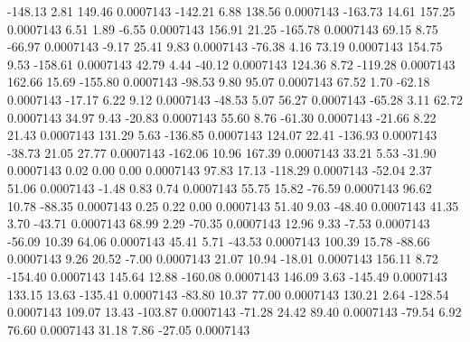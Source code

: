      -148.13        2.81      149.46     0.0007143
     -142.21        6.88      138.56     0.0007143
     -163.73       14.61      157.25     0.0007143
        6.51        1.89       -6.55     0.0007143
      156.91       21.25     -165.78     0.0007143
       69.15        8.75      -66.97     0.0007143
       -9.17       25.41        9.83     0.0007143
      -76.38        4.16       73.19     0.0007143
      154.75        9.53     -158.61     0.0007143
       42.79        4.44      -40.12     0.0007143
      124.36        8.72     -119.28     0.0007143
      162.66       15.69     -155.80     0.0007143
      -98.53        9.80       95.07     0.0007143
       67.52        1.70      -62.18     0.0007143
      -17.17        6.22        9.12     0.0007143
      -48.53        5.07       56.27     0.0007143
      -65.28        3.11       62.72     0.0007143
       34.97        9.43      -20.83     0.0007143
       55.60        8.76      -61.30     0.0007143
      -21.66        8.22       21.43     0.0007143
      131.29        5.63     -136.85     0.0007143
      124.07       22.41     -136.93     0.0007143
      -38.73       21.05       27.77     0.0007143
     -162.06       10.96      167.39     0.0007143
       33.21        5.53      -31.90     0.0007143
        0.02        0.00        0.00     0.0007143
       97.83       17.13     -118.29     0.0007143
      -52.04        2.37       51.06     0.0007143
       -1.48        0.83        0.74     0.0007143
       55.75       15.82      -76.59     0.0007143
       96.62       10.78      -88.35     0.0007143
        0.25        0.22        0.00     0.0007143
       51.40        9.03      -48.40     0.0007143
       41.35        3.70      -43.71     0.0007143
       68.99        2.29      -70.35     0.0007143
       12.96        9.33       -7.53     0.0007143
      -56.09       10.39       64.06     0.0007143
       45.41        5.71      -43.53     0.0007143
      100.39       15.78      -88.66     0.0007143
        9.26       20.52       -7.00     0.0007143
       21.07       10.94      -18.01     0.0007143
      156.11        8.72     -154.40     0.0007143
      145.64       12.88     -160.08     0.0007143
      146.09        3.63     -145.49     0.0007143
      133.15       13.63     -135.41     0.0007143
      -83.80       10.37       77.00     0.0007143
      130.21        2.64     -128.54     0.0007143
      109.07       13.43     -103.87     0.0007143
      -71.28       24.42       89.40     0.0007143
      -79.54        6.92       76.60     0.0007143
       31.18        7.86      -27.05     0.0007143
